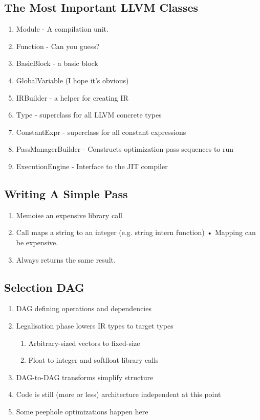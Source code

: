 \documentclass[a4paper]{exam}
\theoremstyle{definition}
\begin{document}
\subsection{The Most Important LLVM Classes}

\begin{enumerate}
  \item Module - A compilation unit.
  \item Function - Can you guess?
  \item BasicBlock - a basic block
  \item GlobalVariable (I hope it's obvious)
  \item IRBuilder - a helper for creating IR
  \item Type - superclass for all LLVM concrete types
  \item ConstantExpr - superclass for all constant expressions
  \item PassManagerBuilder - Constructs optimization pass sequences to run
  \item ExecutionEngine - Interface to the JIT compiler

\end{enumerate}

\subsection{Writing A Simple Pass}
\begin{enumerate}
  \item Memoise an expensive library call
  \item Call maps a string to an integer (e.g. string intern function) • Mapping can be expensive.
  \item Always returns the same result.
\end{enumerate}

\subsection{Selection DAG}
\begin{enumerate}
  \item DAG defining operations and dependencies
  \item Legalisation phase lowers IR types to target types
        \begin{enumerate}
          \item Arbitrary-sized vectors to fixed-size
          \item Float to integer and softfloat library calls
        \end{enumerate}

  \item DAG-to-DAG transforms simplify structure
  \item Code is still (more or less) architecture independent at this
        point
  \item Some peephole optimizations happen here
\end{enumerate}
\end{document}
